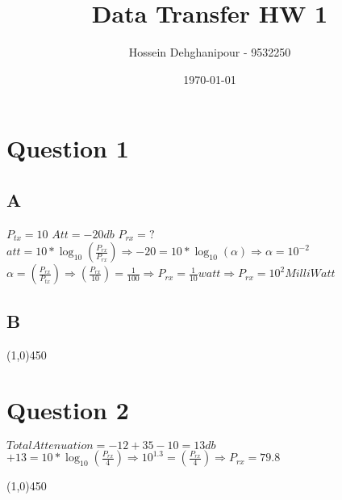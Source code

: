 \documentclass[a4paper,12pt]{book}
\begin{document}
    \begin{titlepage}
        \begin{center}
            \title{\Large{\textbf{Data Transfer HW 1}}}
            \author{Hossein Dehghanipour - 9532250}
            \date{\today}
        \end{center}
    \end{titlepage}
    \maketitle

\setmainfont{Times New Roman}
\tableofcontents
\thispagestyle{empty}
\newpage
{}


\fontsize{15pt}{15pt}
\newcommand{\nnl}{\newline \noindent}
\newcommand{\ptx}{ P_{tx} }
\newcommand{\prx}{ P_{rx} }
\section {Question 1}

\subsection{A}
\begin{doublespace}
 $ P_{tx} = 10 $\nnl
 $Att = -20 db$ \nnl
$P_{rx} = ? $ \nnl
\noindent $ att = 10 * \log_{10} {(\frac {\prx}{\prx})}  \Longrightarrow -20 =  10 * \log_{10} {(\alpha)}   \Longrightarrow   \alpha = 10^{-2}          $ \nnl
$ \alpha = (\frac {\prx}{\ptx})  \Longrightarrow (\frac {\prx}{10})  =   \frac {1}{100}   \Longrightarrow   \prx =  \frac {1}{10} watt \Longrightarrow \prx = 10^{2} Milli Watt$\nnl
\end{doublespace}




\subsection{B}
\line(1,0){450}

\section {Question 2 }
\begin{doublespace}
$Total Attenuation = -12 + 35 - 10 = 13 db $ \\
$+13 = 10 * \log_{10} {(\frac {\prx}{4})}  \Longrightarrow 10^{1.3} = (\frac {\prx}{4}) \Longrightarrow \prx = 79.8 $
\end{doublespace}
\line(1,0){450}
\end{document}
